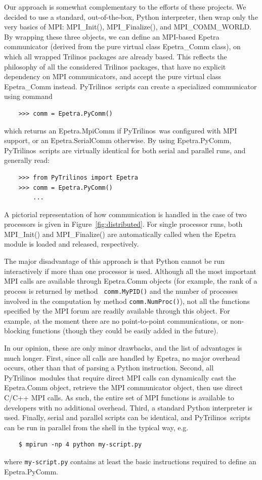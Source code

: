 \documentclass[acmtocl]{acmtrans2m}
\newcommand{\PyTrilinos}{{PyTrilinos}}
\begin{document}
Our approach is somewhat complementary to the efforts of these
projects.  We decided to use a standard, out-of-the-box, Python
interpreter, then wrap only the very basics of MPI: MPI\_Init(),
MPI\_Finalize(), and MPI\_COMM\_WORLD.  By wrapping these three
objects, we can define an MPI-based Epetra communicator (derived from
the pure virtual class Epetra\_Comm class), on which all wrapped
Trilinos packages are already based.  This reflects the philosophy of
all the considered Trilinos packages, that have no explicit dependency
on MPI communicators, and accept the pure virtual class Epetra\_Comm
instead.  \PyTrilinos\ scripts can create a specialized communicator
using command
\begin{verbatim}
    >>> comm = Epetra.PyComm()
\end{verbatim}
which returns an Epetra.MpiComm if \PyTrilinos\ was configured with
MPI support, or an Epetra.SerialComm otherwise.  By using
Epetra.PyComm, \PyTrilinos\ scripts are virtually identical for both
serial and parallel runs, and generally read:
\begin{verbatim}
    >>> from PyTrilinos import Epetra
    >>> comm = Epetra.PyComm()
        ...
\end{verbatim}
A pictorial representation of how communication is handled in the
case of two processors is given in Figure~\ref{fig:distributed}. For
single processor runs, both MPI\_Init() and MPI\_Finalize() are
automatically called when the Epetra module is loaded and released,
respectively.

\smallskip

The major disadvantage of this approach is that Python cannot be run
interactively if more than one processor is used.  Although all the
most important MPI calls are available through Epetra.Comm objects
(for example, the rank of a process is returned by method {\tt
  comm.MyPID()} and the number of processes involved in the
computation by method {\tt comm.NumProc()}), not all the functions
specified by the MPI forum are readily available through this object.
For example, at the moment there are no point-to-point communications,
or non-blocking functions (though they could be easily added in the
future).

In our opinion, these are only minor drawbacks, and the list of
advantages is much longer.  First, since all calls are handled by
Epetra, no major overhead occurs, other than that of parsing a Python
instruction.  Second, all \PyTrilinos\ modules that require direct MPI
calls can dynamically cast the Epetra.Comm object, retrieve the MPI
communicator object, then use direct C/C++ MPI calls.  As such, the
entire set of MPI functions is available to developers with no
additional overhead.  Third, a standard Python interpreter is used.
Finally, serial and parallel scripts can be identical, and \PyTrilinos\
scripts can be run in parallel from the shell in the typical way, e.g.
\begin{verbatim}
    $ mpirun -np 4 python my-script.py
\end{verbatim}
where {\tt my-script.py} contains at least the basic instructions
required to define an Epetra.PyComm.
\end{document}
